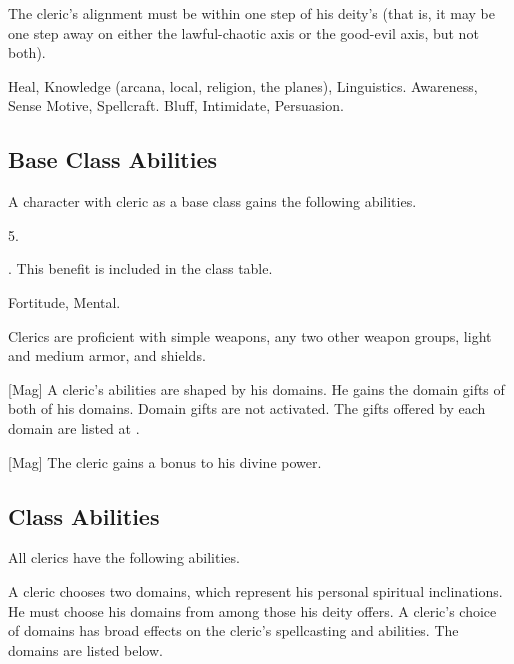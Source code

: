      The cleric's alignment must be within one step of his deity's (that is, it may be one step away on either the lawful-chaotic axis or the good-evil axis, but not both).

     Heal, Knowledge (arcana, local, religion, the planes), Linguistics.
     Awareness, Sense Motive, Spellcraft.
     Bluff, Intimidate, Persuasion.

    \subsection{Base Class Abilities}
        A character with cleric as a base class gains the following abilities.

         5.

         . This benefit is included in the class table.

          Fortitude,  Mental.

        Clerics are proficient with simple weapons, any two other weapon groups, light and medium armor, and shields.

        [Mag]
        A cleric's abilities are shaped by his domains.
        He gains the domain gifts of both of his domains.
        Domain gifts are not activated.
        The gifts offered by each domain are listed at .

        [Mag]
        The cleric gains a  bonus to his divine power.

    \subsection{Class Abilities}
        All clerics have the following abilities.

        A cleric chooses two domains, which represent his personal spiritual inclinations.
        He must choose his domains from among those his deity offers.
        A cleric's choice of domains has broad effects on the cleric's spellcasting and abilities.
        The domains are listed below.

